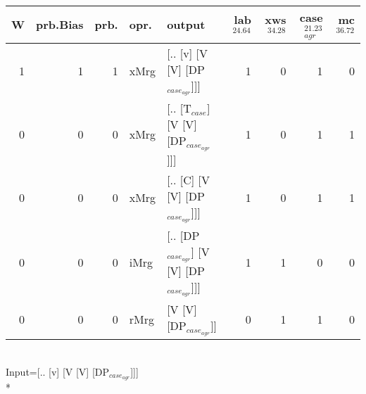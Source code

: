 \begin{tabularx}{\linewidth}{rrrlXrrrr}
\hline
   W &   prb.Bias &   prb. & opr.   & output                                   &   lab$^{24.64}$ &   xws$^{34.28}$ &   case$_{agr}^{21.23}$ &   mc$^{36.72}$ \\
\hline
   1 &       1 &   1 & xMrg & [.. [v] [V [V] [DP$_{case_{agr}}$]]]           &             1 &             0 &                  1 &            0 \\
   0 &       0 &   0 & xMrg & [.. [T$_{case}$] [V [V] [DP$_{case_{agr}}$]]]      &             1 &             0 &                  1 &            1 \\
   0 &       0 &   0 & xMrg & [.. [C] [V [V] [DP$_{case_{agr}}$]]]           &             1 &             0 &                  1 &            1 \\
   0 &       0 &   0 & iMrg & [.. [DP$_{case_{agr}}$] [V [V] [DP$_{case_{agr}}$]]] &             1 &             1 &                  0 &            0 \\
   0 &       0 &   0 & rMrg & [V [V] [DP$_{case_{agr}}$]]                    &             0 &             1 &                  1 &            0 \\
\hline
\end{tabularx}\endgroup\\
\begingroup\scriptsize Input=[.. [v] [V [V] [DP$_{case_{agr}}$]]]\\*

